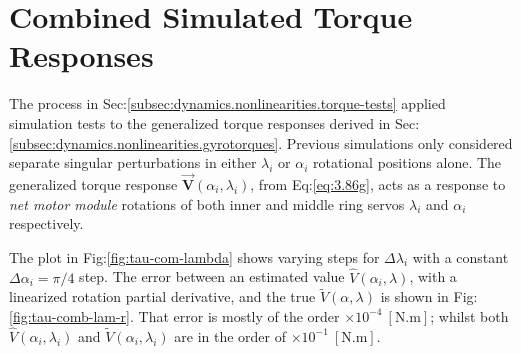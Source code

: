 \section{Combined Simulated Torque Responses}
\label{app:tau-comb}
The process in Sec:\ref{subsec:dynamics.nonlinearities.torque-tests} applied simulation tests to the generalized torque responses derived in Sec:\ref{subsec:dynamics.nonlinearities.gyrotorques}. Previous simulations only considered separate singular perturbations in either $\lambda_i$ or $\alpha_i$ rotational positions alone. The generalized torque response $\vec{\mathbf{V}}(\alpha_i,\lambda_i)$, from Eq:\ref{eq:3.86g}, acts as a response to \emph{net motor module} rotations of both inner and middle ring servos $\lambda_i$ and $\alpha_i$ respectively.
\par
The plot in Fig:\ref{fig:tau-com-lambda} shows varying steps for $\Delta\lambda_i$ with a constant $\Delta\alpha_i=\pi/4$ step. The error between an estimated value $\hat{V}(\alpha_i,\lambda)$, with a linearized rotation partial derivative, and the true $\widetilde{V}(\alpha,\lambda)$ is shown in Fig:\ref{fig:tau-comb-lam-r}. That error is mostly of the order $\times 10^{-4}~[\text{N.m}]$; whilst both $\hat{V}(\alpha_i,\lambda_i)$ and $\widetilde{V}(\alpha_i,\lambda_i)$ are in the order of $\times 10^{-1}~[\text{N.m}]$.
